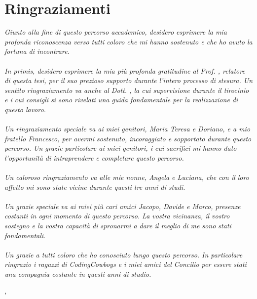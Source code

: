 \cleardoublepage
{}
{}

\bigskip

\begingroup
\let\clearpage\relax
\let\cleardoublepage\relax
\let\cleardoublepage\relax

\chapter*{Ringraziamenti}

\textit{Giunto alla fine di questo percorso accademico, desidero esprimere la mia profonda riconoscenza verso tutti coloro che mi hanno sostenuto e che ho avuto la fortuna di incontrare.}
\\\\
\noindent \textit{In primis, desidero esprimere la mia più profonda gratitudine al Prof. \myProf, relatore di questa tesi, per il suo prezioso supporto durante l'intero processo di stesura. Un sentito ringraziamento va anche al Dott. \myTutor, la cui supervisione durante il tirocinio e i cui consigli si sono rivelati una guida fondamentale per la realizzazione di questo lavoro.}
\\\\
\noindent \textit{Un ringraziamento speciale va ai miei genitori, Maria Teresa e Doriano, e a mio fratello Francesco, per avermi sostenuto, incoraggiato e sopportato durante questo percorso. 
Un grazie particolare ai miei genitori, i cui sacrifici mi hanno dato l'opportunità di intraprendere e completare questo percorso.}
\\\\
\noindent \textit{Un caloroso ringraziamento va alle mie nonne, Angela e Luciana, che con il loro affetto mi sono state vicine durante questi tre anni di studi.}
\\\\
\noindent \textit{Un grazie speciale va ai miei più cari amici Jacopo, Davide e Marco, presenze costanti in ogni momento di questo percorso. La vostra vicinanza, il vostro sostegno e la vostra capacità di spronarmi a dare il meglio di me sono stati fondamentali.}
\\\\
\noindent \textit{Un grazie a tutti coloro che ho conosciuto lungo questo percorso. In particolare ringrazio i ragazzi di CodingCowboys e i miei amici del Concilio per essere stati una compagnia costante in questi anni di studio.}
\bigskip

\noindent\textit{\myLocation, \myTime}
\hfill \myName 

\endgroup
